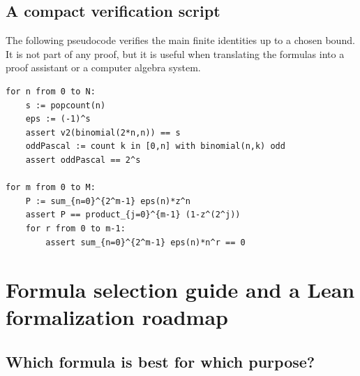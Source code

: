 \documentclass[11pt,oneside]{article}
\theoremstyle{definition}
\theoremstyle{remark}
\newcommand{\1}{\mathbf 1}
\begin{document}
\subsection{A compact verification script}

The following pseudocode verifies the main finite identities up to a chosen bound.  It is not
part of any proof, but it is useful when translating the formulas into a proof assistant or a
computer algebra system.

\begin{lstlisting}[style=pseudo]
for n from 0 to N:
    s := popcount(n)
    eps := (-1)^s
    assert v2(binomial(2*n,n)) == s
    oddPascal := count k in [0,n] with binomial(n,k) odd
    assert oddPascal == 2^s

for m from 0 to M:
    P := sum_{n=0}^{2^m-1} eps(n)*z^n
    assert P == product_{j=0}^{m-1} (1-z^(2^j))
    for r from 0 to m-1:
        assert sum_{n=0}^{2^m-1} eps(n)*n^r == 0
\end{lstlisting}

\section{Formula selection guide and a Lean formalization roadmap}
\label{sec:roadmap}

\subsection{Which formula is best for which purpose?}
\end{document}
